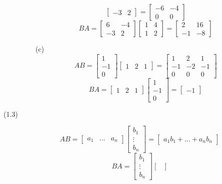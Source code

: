 \documentclass[openany]{book}
\begin{document}
\begin{description}
\begin{itemize}
$$\begin{bmatrix}
-3 & 2
\end{bmatrix} = \begin{bmatrix}
-6 & -4 \\
0 & 0
\end{bmatrix}$$
$$BA = \begin{bmatrix}
6 & -4 \\
-3 & 2
\end{bmatrix}\begin{bmatrix}
1 & 4 \\
1 & 2
\end{bmatrix} = \begin{bmatrix}
2 & 16 \\
-1 & -8
\end{bmatrix}$$
\item[(c)]
$$AB = \begin{bmatrix}
1 \\
-1 \\
0
\end{bmatrix}\begin{bmatrix}
1 & 2 & 1
\end{bmatrix} = \begin{bmatrix}
1 & 2 & 1 \\
-1 & -2 & -1 \\
0 & 0 & 0
\end{bmatrix}$$
$$BA = \begin{bmatrix}
1 & 2 & 1
\end{bmatrix}\begin{bmatrix}
1 \\
-1 \\
0
\end{bmatrix} = \begin{bmatrix}
-1
\end{bmatrix}$$
\end{itemize}
\item[(1.3)]
$$AB = \begin{bmatrix}
a_1 & \hdots & a_n
\end{bmatrix}\begin{bmatrix}
b_1 \\
\vdots \\
b_n
\end{bmatrix} = \begin{bmatrix}
a_1b_1 + ... + a_nb_n
\end{bmatrix}$$
$$BA = \begin{bmatrix}
b_1 \\
\vdots \\
b_n
\end{bmatrix}\begin{bmatrix}

\end{bmatrix}$$
\end{description}
\end{document}
